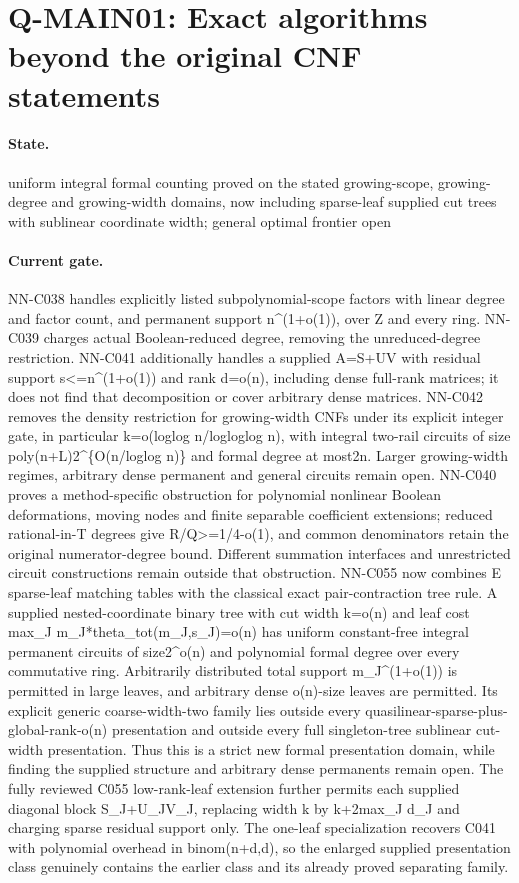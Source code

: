 \section{Q-MAIN01: Exact algorithms beyond the original CNF statements}
\paragraph{State.} uniform integral formal counting proved on the stated growing-scope, growing-degree and growing-width domains, now including sparse-leaf supplied cut trees with sublinear coordinate width; general optimal frontier open
\paragraph{Current gate.} NN-C038 handles explicitly listed subpolynomial-scope factors with linear degree and factor count, and permanent support n\textasciicircum{}(1+o(1)), over Z and every ring. NN-C039 charges actual Boolean-reduced degree, removing the unreduced-degree restriction. NN-C041 additionally handles a supplied A=S+UV with residual support s<=n\textasciicircum{}(1+o(1)) and rank d=o(n), including dense full-rank matrices; it does not find that decomposition or cover arbitrary dense matrices. NN-C042 removes the density restriction for growing-width CNFs under its explicit integer gate, in particular k=o(loglog n/logloglog n), with integral two-rail circuits of size poly(n+L)2\textasciicircum{}\{O(n/loglog n)\} and formal degree at most2n. Larger growing-width regimes, arbitrary dense permanent and general circuits remain open. NN-C040 proves a method-specific obstruction for polynomial nonlinear Boolean deformations, moving nodes and finite separable coefficient extensions; reduced rational-in-T degrees give R/Q>=1/4-o(1), and common denominators retain the original numerator-degree bound. Different summation interfaces and unrestricted circuit constructions remain outside that obstruction. NN-C055 now combines E sparse-leaf matching tables with the classical exact pair-contraction tree rule. A supplied nested-coordinate binary tree with cut width k=o(n) and leaf cost max\_J m\_J*theta\_tot(m\_J,s\_J)=o(n) has uniform constant-free integral permanent circuits of size2\textasciicircum{}o(n) and polynomial formal degree over every commutative ring. Arbitrarily distributed total support m\_J\textasciicircum{}(1+o(1)) is permitted in large leaves, and arbitrary dense o(n)-size leaves are permitted. Its explicit generic coarse-width-two family lies outside every quasilinear-sparse-plus-global-rank-o(n) presentation and outside every full singleton-tree sublinear cut-width presentation. Thus this is a strict new formal presentation domain, while finding the supplied structure and arbitrary dense permanents remain open. The fully reviewed C055 low-rank-leaf extension further permits each supplied diagonal block S\_J+U\_JV\_J, replacing width k by k+2max\_J d\_J and charging sparse residual support only. The one-leaf specialization recovers C041 with polynomial overhead in binom(n+d,d), so the enlarged supplied presentation class genuinely contains the earlier class and its already proved separating family.
